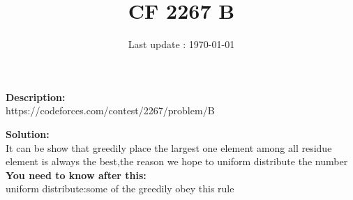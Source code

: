 \documentclass{article}
\begin{document}
\title{\textbf{CF 2267 B}}
\author{}
\date{Last update : \today}

\maketitle

\noindent \textbf{Description:}\\
https://codeforces.com/contest/2267/problem/B

\noindent \textbf{Solution:}\\
It can be show that greedily place the largest one element among all residue element is always the best,the reason we hope to uniform distribute the number
\\
\noindent \textbf{You need to know after this:}\\
uniform distribute:some of the greedily obey this rule
\end{document}

